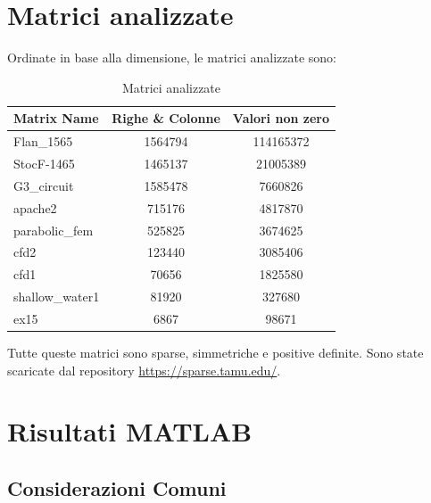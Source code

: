 \section{Matrici analizzate}

Ordinate in base alla dimensione, le matrici analizzate sono:

\begin{table}[H]
    \centering
    \caption{Matrici analizzate}
    \begin{tabular}{lcc}
        \toprule
        Matrix Name & Righe \& Colonne & Valori non zero \\
        \midrule
        Flan\_1565 & \num{1564794} & \num{114165372} \\
        StocF-1465 & \num{1465137} & \num{21005389} \\
        G3\_circuit & \num{1585478} & \num{7660826} \\
        apache2 & \num{715176} & \num{4817870} \\
        parabolic\_fem & \num{525825} & \num{3674625} \\
        cfd2 & \num{123440} & \num{3085406} \\
        cfd1 & \num{70656} & \num{1825580} \\
        shallow\_water1 & \num{81920} & \num{327680} \\
        ex15 & \num{6867} & \num{98671} \\
        \bottomrule
    \end{tabular}
    \label{tab:matrices}
\end{table}

Tutte queste matrici sono sparse, simmetriche e positive definite. 
Sono state scaricate dal repository \url{https://sparse.tamu.edu/}.

\section{Risultati MATLAB}

\subsection{Considerazioni Comuni}

